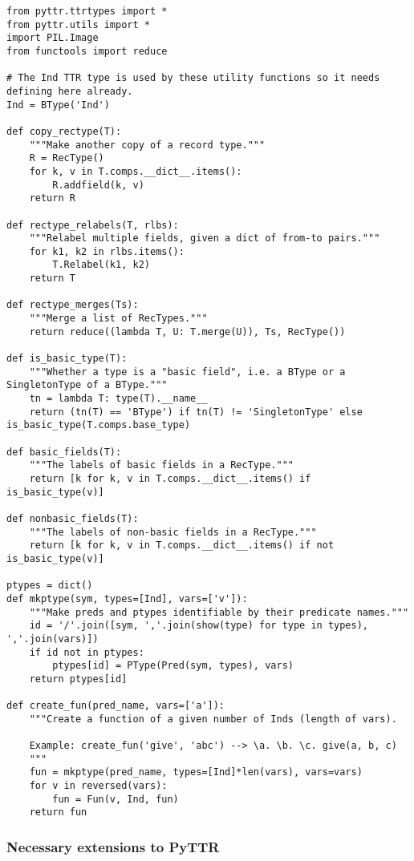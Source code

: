 \begin{lstlisting}[label=lst:utility,caption=Utility functions]
from pyttr.ttrtypes import *
from pyttr.utils import *
import PIL.Image
from functools import reduce

# The Ind TTR type is used by these utility functions so it needs defining here already.
Ind = BType('Ind')
    
def copy_rectype(T):
    """Make another copy of a record type."""
    R = RecType()
    for k, v in T.comps.__dict__.items():
        R.addfield(k, v)
    return R

def rectype_relabels(T, rlbs):
    """Relabel multiple fields, given a dict of from-to pairs."""
    for k1, k2 in rlbs.items():
        T.Relabel(k1, k2)
    return T

def rectype_merges(Ts):
    """Merge a list of RecTypes."""
    return reduce((lambda T, U: T.merge(U)), Ts, RecType())

def is_basic_type(T):
    """Whether a type is a "basic field", i.e. a BType or a SingletonType of a BType."""
    tn = lambda T: type(T).__name__
    return (tn(T) == 'BType') if tn(T) != 'SingletonType' else is_basic_type(T.comps.base_type)

def basic_fields(T):
    """The labels of basic fields in a RecType."""
    return [k for k, v in T.comps.__dict__.items() if is_basic_type(v)]

def nonbasic_fields(T):
    """The labels of non-basic fields in a RecType."""
    return [k for k, v in T.comps.__dict__.items() if not is_basic_type(v)]

ptypes = dict()
def mkptype(sym, types=[Ind], vars=['v']):
    """Make preds and ptypes identifiable by their predicate names."""
    id = '/'.join([sym, ','.join(show(type) for type in types), ','.join(vars)])
    if id not in ptypes:
        ptypes[id] = PType(Pred(sym, types), vars)
    return ptypes[id]

def create_fun(pred_name, vars=['a']):
    """Create a function of a given number of Inds (length of vars).
    
    Example: create_fun('give', 'abc') --> \a. \b. \c. give(a, b, c)
    """
    fun = mkptype(pred_name, types=[Ind]*len(vars), vars=vars)
    for v in reversed(vars):
        fun = Fun(v, Ind, fun)
    return fun
\end{lstlisting}

\subsubsection{Necessary extensions to PyTTR}


